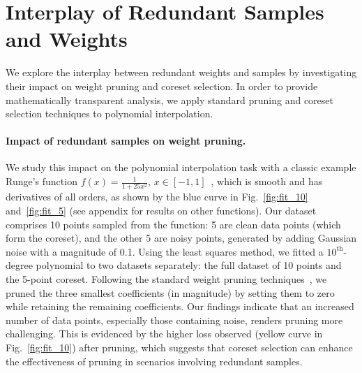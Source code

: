 \section{Interplay of Redundant Samples and Weights}
\label{sec:poly}
We explore the interplay between redundant weights and samples by investigating their impact on weight pruning and coreset selection. 
In order to provide mathematically transparent analysis, we apply standard pruning and coreset selection techniques to polynomial interpolation.

\paragraph{Impact of redundant samples on weight pruning.} We study this impact on the polynomial interpolation task with a classic example  
Runge's function \( f(x) = \frac{1}{1 + 25x^2}, \, x \in [-1, 1] \)~\cite{runge1901empirische}, which is smooth and has derivatives of all orders, as shown by the {\color{blue}blue curve} in Fig.~\ref{fig:fit_10} and~\ref{fig:fit_5} (see appendix for results on other functions).
Our dataset comprises 10 points sampled from the function: 5 are clean data points (which form the coreset), and the other 5 are noisy points, generated by adding Gaussian noise with a magnitude of 0.1. Using the least squares method, we fitted a \(10^{\text{th}}\)-degree polynomial to two datasets separately: the full dataset of 10 points and the 5-point coreset. Following the standard weight pruning techniques~\cite{han2016deep}, we pruned the three smallest coefficients (in magnitude) by setting them to zero while retaining the remaining coefficients. 
Our findings indicate that an increased number of data points, especially those containing noise, renders pruning more challenging. This is evidenced by the higher loss observed ({\color{orange}yellow curve} in Fig.~\ref{fig:fit_10}) after pruning, which suggests that coreset selection can enhance the effectiveness of pruning in scenarios involving redundant samples.

